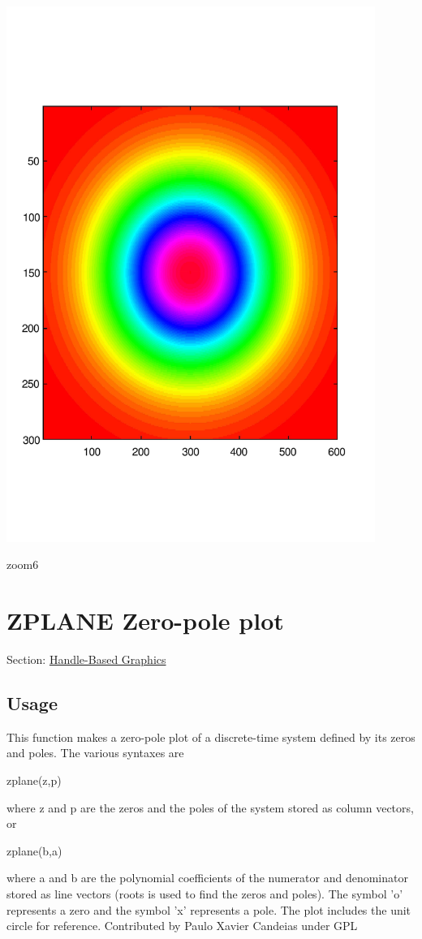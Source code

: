  
\begin{DoxyImage}
\includegraphics[width=12cm]{zoom6}
\caption{zoom6}
\end{DoxyImage}
 \hypertarget{handle_zplane}{}\section{Z\-P\-L\-A\-N\-E Zero-\/pole plot}\label{handle_zplane}
Section\-: \hyperlink{sec_handle}{Handle-\/\-Based Graphics} \hypertarget{vtkwidgets_vtkxyplotwidget_Usage}{}\subsection{Usage}\label{vtkwidgets_vtkxyplotwidget_Usage}
This function makes a zero-\/pole plot of a discrete-\/time system defined by its zeros and poles. The various syntaxes are \begin{DoxyVerb}    zplane(z,p)
\end{DoxyVerb}
 where {\ttfamily z} and {\ttfamily p} are the zeros and the poles of the system stored as column vectors, or \begin{DoxyVerb}    zplane(b,a)
\end{DoxyVerb}
 where {\ttfamily a} and {\ttfamily b} are the polynomial coefficients of the numerator and denominator stored as line vectors ({\ttfamily roots} is used to find the zeros and poles). The symbol {\ttfamily 'o'} represents a zero and the symbol {\ttfamily 'x'} represents a pole. The plot includes the unit circle for reference. Contributed by Paulo Xavier Candeias under G\-P\-L 